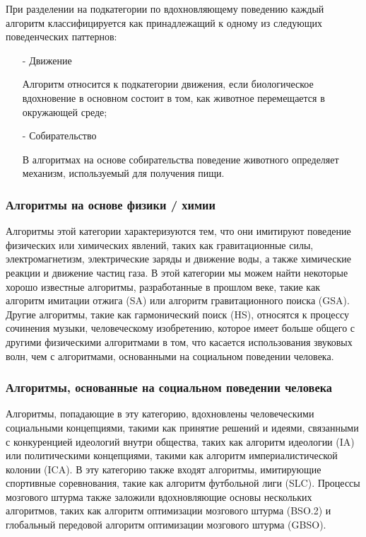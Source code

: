     При разделении на подкатегории по вдохновляющему поведению каждый 
    алгоритм классифицируется как принадлежащий к одному из следующих 
    поведенческих паттернов:
            
        \begin{itemize}
            \item[-] Движение

            Алгоритм относится к подкатегории  
            движения, если биологическое вдохновение в основном состоит в 
            том, как животное перемещается в окружающей среде;

            \item[-] Собирательство 
            
            В алгоритмах на основе собирательства поведение животного определяет 
            механизм, используемый для получения пищи.

        \end{itemize}


    \subsubsection{Алгоритмы на основе физики / химии}
    
    Алгоритмы этой категории характеризуются тем, что они имитируют поведение 
    физических или химических явлений, таких как гравитационные силы, 
    электромагнетизм, электрические заряды и движение воды, а также химические 
    реакции и движение частиц газа. В этой категории мы можем найти 
    некоторые хорошо известные алгоритмы, разработанные в прошлом веке, 
    такие как алгоритм имитации отжига (SA) или алгоритм гравитационного поиска (GSA). 
    Другие алгоритмы, такие как гармонический поиск (HS), относятся к процессу сочинения 
    музыки, человеческому изобретению, которое имеет больше общего с другими 
    физическими алгоритмами в том, что касается использования звуковых волн, 
    чем с алгоритмами, основанными на социальном поведении человека.
    
    \subsubsection{Алгоритмы, основанные на социальном поведении человека}
    
    Алгоритмы, попадающие в эту категорию, вдохновлены человеческими социальными 
    концепциями, такими как принятие решений и идеями, связанными с конкуренцией 
    идеологий внутри общества, таких как алгоритм идеологии (IA) или политическими 
    концепциями, такими как алгоритм империалистической колонии (ICA). В эту 
    категорию также входят алгоритмы, имитирующие спортивные соревнования, 
    такие как алгоритм футбольной лиги (SLC). Процессы мозгового штурма также заложили 
    вдохновляющие основы нескольких алгоритмов, таких как алгоритм оптимизации 
    мозгового штурма (BSO.2) и глобальный передовой алгоритм оптимизации мозгового 
    штурма (GBSO).

